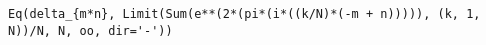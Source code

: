 \begin{verbatim}
Eq(delta_{m*n}, Limit(Sum(e**(2*(pi*(i*((k/N)*(-m + n))))), (k, 1, N))/N, N, oo, dir='-'))
\end{verbatim}
